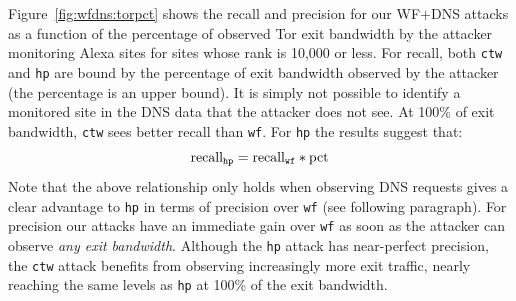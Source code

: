 Figure~\ref{fig:wfdns:torpct} shows the recall and precision for our WF+DNS
attacks as a function of the percentage of observed Tor exit bandwidth by the
attacker monitoring Alexa sites for sites whose rank is 10,000 or less.
For recall, both \texttt{ctw} and \texttt{hp} are bound by the
percentage of exit bandwidth observed by the attacker (the percentage is an
upper bound).
It is simply not possible to identify a monitored site in the DNS data that
the attacker does not see. At 100\% of exit bandwidth, \texttt{ctw} sees
better recall than \texttt{wf}. For \texttt{hp} the results suggest that:
\begin{equation}
	\label{eq:hprecall}
	\textnormal{recall}_{\texttt{hp}} = \textnormal{recall}_{\texttt{wf}} * \textnormal{pct}
\end{equation}
Note that the above relationship only holds when observing DNS requests gives
a clear advantage to \texttt{hp} in terms of precision over \texttt{wf} (see
following paragraph).
For precision our attacks have an immediate gain over \texttt{wf} as soon as
the attacker can observe \emph{any exit bandwidth}.
Although the \texttt{hp} attack has near-perfect precision, the
\texttt{ctw} attack benefits from observing increasingly more exit traffic,
nearly reaching the same levels as \texttt{hp} at 100\% of the exit bandwidth.


